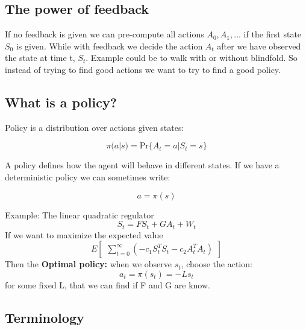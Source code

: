 \subsection*{The power of feedback}
If no feedback is given we can pre-compute all actions $A_0,A_1,...$ if the first state $S_0$ is given. While with feedback we decide the action $A_t$ after we have observed the state at time t, $S_t$. Example could be to walk with or without blindfold. So instead of trying to find good actions we want to try to find a good policy. 

\subsection*{What is a policy?}
Policy is a distribution over actions given states:

	\begin{equation}
		\pi(a |s) = \text{Pr}\{ A_t = a | S_t = s\}
	\end{equation}

A policy defines how the agent will behave in different states. If we have a deterministic policy we can sometimes write:

	\begin{equation}
		a = \pi(s)
	\end{equation}

\begin{example}{Example: The linear quadratic regulator}
	\begin{equation}
		S_t = FS_t + GA_t + W_t
	\end{equation}
	If we want to maximize the expected value
	\begin{equation}
		E \begin{bmatrix} \sum_{t=0}^{\infty} (-c_1S_t^{T}S_t - c_2A_t^{T}A_t )\end{bmatrix}
	\end{equation}
	Then the \textbf{Optimal policy:} when we observe $s_t$, choose the action:
	\begin{equation}
		a_t = \pi(s_t) = -Ls_t
	\end{equation}
	for some fixed L, that we can find if F and G are know.
\end{example}	

\subsection*{Terminology}

